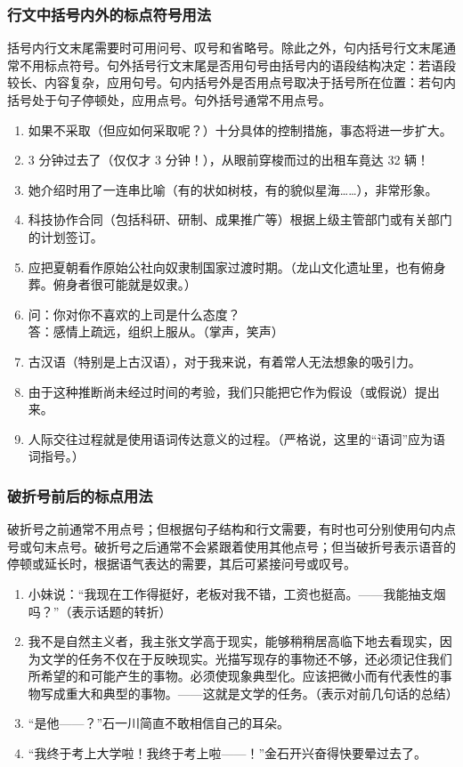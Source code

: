 \documentclass[a4paper]{article}
\begin{document}
\subsubsection{行文中括号内外的标点符号用法}

括号内行文末尾需要时可用问号、叹号和省略号。除此之外，句内括号行文末尾通常不用标点符号。句外括号行文末尾是否用句号由括号内的语段结构决定：若语段较长、内容复杂，应用句号。句内括号外是否用点号取决于括号所在位置：若句内括号处于句子停顿处，应用点号。句外括号通常不用点号。

\begin{enumerate}
    \item 如果不采取（但应如何采取呢？）十分具体的控制措施，事态将进一步扩大。
    \item 3 分钟过去了（仅仅才 3 分钟！），从眼前穿梭而过的出租车竟达 32 辆！
    \item 她介绍时用了一连串比喻（有的状如树枝，有的貌似星海……），非常形象。
    \item 科技协作合同（包括科研、研制、成果推广等）根据上级主管部门或有关部门的计划签订。
    \item 应把夏朝看作原始公社向奴隶制国家过渡时期。（龙山文化遗址里，也有俯身葬。俯身者很可能就是奴隶。）
    \item 问：你对你不喜欢的上司是什么态度？\\答：感情上疏远，组织上服从。（掌声，笑声）
    \item 古汉语（特别是上古汉语），对于我来说，有着常人无法想象的吸引力。
    \item 由于这种推断尚未经过时间的考验，我们只能把它作为假设（或假说）提出来。
    \item 人际交往过程就是使用语词传达意义的过程。（严格说，这里的“语词”应为语词指号。）
\end{enumerate}

\subsubsection{破折号前后的标点用法}

破折号之前通常不用点号；但根据句子结构和行文需要，有时也可分别使用句内点号或句末点号。破折号之后通常不会紧跟着使用其他点号；但当破折号表示语音的停顿或延长时，根据语气表达的需要，其后可紧接问号或叹号。

\begin{enumerate}
    \item 小妹说：“我现在工作得挺好，老板对我不错，工资也挺高。——我能抽支烟吗？”（表示话题的转折）
    \item 我不是自然主义者，我主张文学高于现实，能够稍稍居高临下地去看现实，因为文学的任务不仅在于反映现实。光描写现存的事物还不够，还必须记住我们所希望的和可能产生的事物。必须使现象典型化。应该把微小而有代表性的事物写成重大和典型的事物。——这就是文学的任务。（表示对前几句话的总结）
    \item “是他——？”石一川简直不敢相信自己的耳朵。
    \item “我终于考上大学啦！我终于考上啦——！”金石开兴奋得快要晕过去了。
\end{enumerate}
\end{document}
